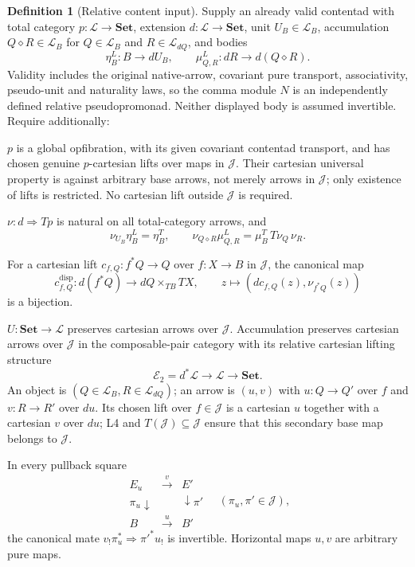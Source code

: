 \documentclass[11pt,a4paper]{article}
\theoremstyle{definition}
\newtheorem{definition}[theorem]{Definition}
\newcommand{\Set}{\mathbf{Set}}
\newcommand{\Lcat}{\mathcal L}
\newcommand{\J}{\mathcal J}
\newcommand{\diamondc}{\mathbin{\diamond}}
\begin{document}
\begin{definition}[Relative content input]\label{def:content}
Supply an already valid contentad with total category $p:\Lcat\to\Set$,
extension $d:\Lcat\to\Set$, unit $U_B\in\Lcat_B$, accumulation
$Q\diamondc R\in\Lcat_B$ for $Q\in\Lcat_B$ and $R\in\Lcat_{dQ}$, and bodies
\[
 \eta^L_B:B\to dU_B,\qquad
 \mu^L_{Q,R}:dR\to d(Q\diamondc R).
\]
Validity includes the original native-arrow, covariant pure transport,
associativity, pseudo-unit and naturality laws, so the comma module $N$ is an
independently defined relative pseudopromonad. Neither displayed body is assumed
invertible. Require additionally:
\begin{description}[style=nextline]
\item[L2 relative lifts and global transport] $p$ is a global opfibration,
with its given covariant contentad transport, and has chosen genuine
$p$-cartesian lifts over maps in $\J$. Their cartesian universal property is
against arbitrary base arrows, not merely arrows in $\J$; only existence of
lifts is restricted. No cartesian lift outside $\J$ is required.
\item[L3 arity] $\nu:d\Rightarrow Tp$ is natural on all total-category arrows,
and
\begin{equation}\label{eq:arity}
 \nu_{U_B}\eta^L_B=\eta^T_B,\qquad
 \nu_{Q\diamondc R}\mu^L_{Q,R}
 =\mu^T_B\,T\nu_Q\,\nu_R.
\end{equation}
\item[L4 relative display] For a cartesian lift
$c_{f,Q}:f^*Q\to Q$ over $f:X\to B$ in $\J$, the canonical map
\begin{equation}\label{eq:display}
 c^{\mathrm{disp}}_{f,Q}:d(f^*Q)
 \longrightarrow dQ\mathbin{\times_{TB}}TX,
 \qquad z\longmapsto(d c_{f,Q}(z),\nu_{f^*Q}(z))
\end{equation}
is a bijection.
\item[L5 relative cartesian algebra] $U:\Set\to\Lcat$ preserves cartesian
arrows over $\J$. Accumulation preserves cartesian arrows over $\J$ in the
composable-pair category with its relative cartesian lifting structure
\[
 \mathcal E_2=d^*\Lcat\longrightarrow\Lcat\longrightarrow\Set.
\]
An object is $(Q\in\Lcat_B,R\in\Lcat_{dQ})$; an arrow is $(u,v)$ with
$u:Q\to Q'$ over $f$ and $v:R\to R'$ over $du$. Its chosen lift over $f\in\J$ is a cartesian $u$ together with a
cartesian $v$ over $du$; L4 and $T(\J)\subseteq\J$ ensure that this
secondary base map belongs to $\J$.
\item[L6 relative BC] In every pullback square
\[
 \begin{array}{ccc}
 E_u&\xrightarrow{v}&E'\\
 {\scriptstyle\pi_u}\downarrow&&\downarrow{\scriptstyle\pi'}\\
 B&\xrightarrow{u}&B'
 \end{array}
 \quad(\pi_u,\pi'\in\J),
\]
the canonical mate $v_!\pi_u^*\Rightarrow\pi'^*u_!$ is invertible. Horizontal
maps $u,v$ are arbitrary pure maps.
\end{description}
\end{definition}
\end{document}
